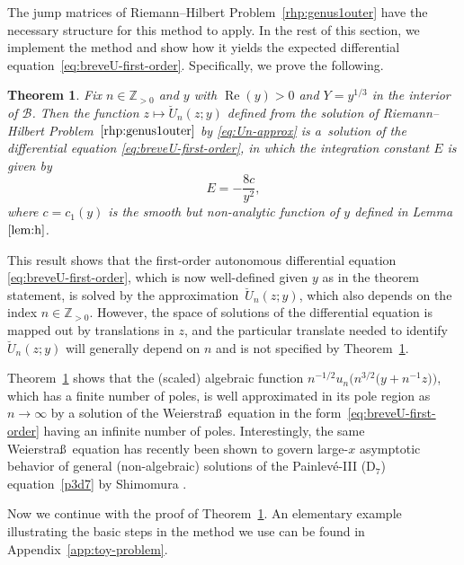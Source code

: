 \documentclass[pdftex]{sigma}
\numberwithin{equation}{section}
\newtheorem{Theorem}{Theorem}[section]
\begin{document}
The jump matrices of Riemann--Hilbert Problem~\ref{rhp:genus1outer} have the necessary structure for this method to apply. In the rest of this section, we implement the method and show how it yields the expected differential equation~\eqref{eq:breveU-first-order}. Specifically, we prove the following.
\begin{Theorem}\label{thm:main-goal}
Fix $n\in\mathbb{Z}_{>0}$ and $y$ with $\operatorname{Re}(y)>0$ and $Y=y^{1/3}$ in the
interior of $\mathcal{B}$. Then the function $z\mapsto \breve{U}_n(z;y)$ defined
from the solution of Riemann--Hilbert Problem~$\ref{rhp:genus1outer}$ by
\eqref{eq:Un-approx} is a~solution of the differential equation
\eqref{eq:breveU-first-order}, in which the integration constant $E$ is given by
\begin{equation}
E=-\frac{8c}{y^2},
\label{eq:Ec}
\end{equation}
where $c=c_1(y)$ is the smooth but non-analytic function of $y$ defined in Lemma~$\ref{lem:h}$.
\end{Theorem}

\begin{Remark}
This result shows that the first-order autonomous differential equation
\eqref{eq:breveU-first-order}, which is now well-defined given $y$ as in the theorem
statement, is solved by the approximation~$\breve{U}_n(z;y)$, which also depends on
the index $n\in\mathbb{Z}_{>0}$. However, the space of solutions of the differential
equation is mapped out by translations in $z$, and the particular translate needed to
identify $\breve{U}_n(z;y)$ will generally depend on $n$ and is not specified by
Theorem~\ref{thm:main-goal}.
\end{Remark}

\begin{Remark}
Theorem~\ref{thm:main-goal} shows that the (scaled) algebraic function
$n^{-1/2}u_n\bigl(n^{3/2}\bigl(y+n^{-1}z\bigr)\bigr)$, which has a finite number of poles, is well approximated in
its pole region as $n\to\infty$ by a solution of the Weierstra\ss\ equation
in the form~\eqref{eq:breveU-first-order} having an infinite number of poles. Interestingly, the same Weierstra\ss\ equation has
recently been shown to govern large-$x$ asymptotic behavior of general (non-algebraic)
solutions of the Painlev\'e-III (D$_7$) equation~\eqref{p3d7} by Shimomura
\cite{Shimomura:2022}.
\end{Remark}

Now we continue with the proof of Theorem~\ref{thm:main-goal}. An elementary example illustrating the basic steps in the method we use can be found in Appendix~\ref{app:toy-problem}.
\end{document}
